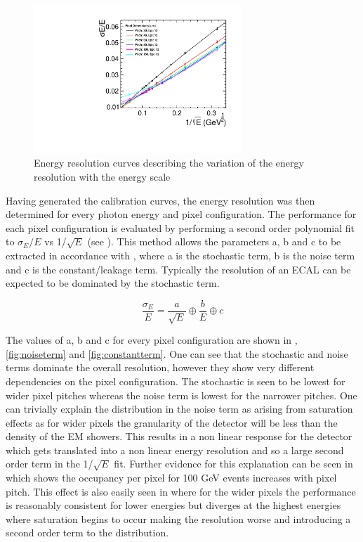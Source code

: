\begin{figure}
  \centering
  \includegraphics[width=0.7\textwidth,keepaspectratio]{DECALStudies/fig/ResolutionFits.pdf}
  \caption{Energy resolution curves describing the variation of the energy resolution with the energy scale}
  \label{fig:resolutionfits}
\end{figure}

Having generated the calibration curves, the energy resolution was then determined for every photon energy and pixel configuration. The performance for each pixel configuration is evaluated by performing a second order polynomial fit to $\sigma_E/E$ vs 1/$\sqrt{E}$ (see ). This method allows the parameters a, b and c to be extracted in accordance with , where a is the stochastic term, b is the noise term and c is the constant/leakage term. Typically the resolution of an \ac{ECAL} can be expected to be dominated by the stochastic term. 

\begin{equation}
  \label{eq:resolutionformula}
  \frac{\sigma_E}{E}=\frac{a}{\sqrt{E}} \oplus \frac{b}{E} \oplus c
\end{equation}

The values of a, b and c for every pixel configuration are shown in , \ref{fig:noiseterm} and \ref{fig:constantterm}. One can see that the stochastic and noise terms dominate the overall resolution, however they show very different dependencies on the pixel configuration. The stochastic is seen to be lowest for wider pixel pitches whereas the noise term is lowest for the narrower pitches. One can trivially explain the distribution in the noise term as arising from saturation effects as for wider pixels the granularity of the detector will be less than the density of the EM showers. This results in a non linear response for the detector which gets translated into a non linear energy resolution and so a large second order term in the 1/$\sqrt{E}$ fit. Further evidence for this explanation can be seen in  which shows the occupancy per pixel for 100 GeV events increases with pixel pitch. This effect is also easily seen in  where for the wider pixels the performance is reasonably consistent for lower energies but diverges at the highest energies where saturation begins to occur making the resolution worse and introducing a second order term to the distribution.

